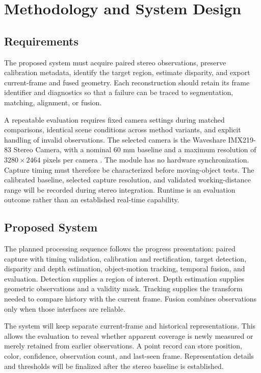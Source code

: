 \chapter{Methodology and System Design}
\section{Requirements}
The proposed system must acquire paired stereo observations, preserve calibration metadata, identify the target region, estimate disparity, and export current-frame and fused geometry. Each reconstruction should retain its frame identifier and diagnostics so that a failure can be traced to segmentation, matching, alignment, or fusion.

A repeatable evaluation requires fixed camera settings during matched comparisons, identical scene conditions across method variants, and explicit handling of invalid observations. The selected camera is the Waveshare IMX219-83 Stereo Camera, with a nominal 60 mm baseline and a maximum resolution of $3280\times2464$ pixels per camera \cite{waveshare}. The module has no hardware synchronization. Capture timing must therefore be characterized before moving-object tests. The calibrated baseline, selected capture resolution, and validated working-distance range will be recorded during stereo integration. Runtime is an evaluation outcome rather than an established real-time capability.

\section{Proposed System}
The planned processing sequence follows the progress presentation: paired capture with timing validation, calibration and rectification, target detection, disparity and depth estimation, object-motion tracking, temporal fusion, and evaluation. Detection supplies a region of interest. Depth estimation supplies geometric observations and a validity mask. Tracking supplies the transform needed to compare history with the current frame. Fusion combines observations only when those interfaces are reliable.

The system will keep separate current-frame and historical representations. This allows the evaluation to reveal whether apparent coverage is newly measured or merely retained from earlier observations. A point record can store position, color, confidence, observation count, and last-seen frame. Representation details and thresholds will be finalized after the stereo baseline is established.

